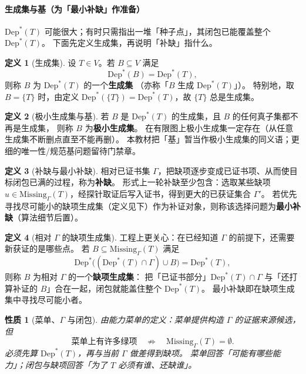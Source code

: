 \documentclass[UTF8,a4paper,11pt]{ctexart}
\theoremstyle{definition}
\newtheorem{definition}{定义}[section]
\theoremstyle{plain}
\newtheorem{property}{性质}[section]
\theoremstyle{remark}
\numberwithin{figure}{section}
\numberwithin{table}{section}
\begin{document}
\paragraph{生成集与基（为「最小补缺」作准备）}
$\mathrm{Dep}^*(T)$ 可能很大；有时只需指出一堆「种子点」，其闭包已能覆盖整个 $\mathrm{Dep}^*(T)$。
下面先定义生成集，再说明「补缺」指什么。

\begin{definition}[生成集]
设 $T\in V$。若 $B\subseteq V$ 满足
\[
\mathrm{Dep}^*(B)=\mathrm{Dep}^*(T),
\]
则称 $B$ 为 $\mathrm{Dep}^*(T)$ 的一个\textbf{生成集}
（亦称「$B$ 生成 $\mathrm{Dep}^*(T)$」）。
特别地，取 $B=\{T\}$ 时，由定义 $\mathrm{Dep}^*(\{T\})=\mathrm{Dep}^*(T)$，故 $\{T\}$ 总是生成集。
\end{definition}

\begin{definition}[极小生成集与基]
若 $B$ 是 $\mathrm{Dep}^*(T)$ 的生成集，且 $B$ 的任何真子集都不再是生成集，
则称 $B$ 为\textbf{极小生成集}。
在有限图上极小生成集一定存在（从任意生成集不断删点直至不能再删）。
本教材把「基」暂当作极小生成集的同义语；更细的唯一性/规范基问题留待门禁章。
\end{definition}

\begin{definition}[补缺与最小补缺]
相对已证书集 $\Gamma$，把缺项逐步变成已证书项、从而使目标闭包已满的过程，称为\textbf{补缺}。
形式上一轮补缺至少包含：选取某些缺项 $u\in\mathrm{Missing}_\Gamma(T)$，经探针取证后写入证书，得到更大的已获证集合 $\Gamma'$。
若优先寻找尽可能小的缺项生成集（定义见下）作为补证对象，则称该选择问题为\textbf{最小补缺}（算法细节后置）。
\end{definition}

\begin{definition}[相对 $\Gamma$ 的缺项生成集]
工程上更关心：在已经知道 $\Gamma$ 的前提下，还需要新获证的是哪些点。
若 $B\subseteq\mathrm{Missing}_\Gamma(T)$ 满足
\[
\mathrm{Dep}^*\bigl((\mathrm{Dep}^*(T)\cap\Gamma)\cup B\bigr)=\mathrm{Dep}^*(T),
\]
则称 $B$ 为相对 $\Gamma$ 的一个\textbf{缺项生成集}：
把「已证书部分」$\mathrm{Dep}^*(T)\cap\Gamma$ 与「还打算补证的 $B$」合在一起，闭包就能盖住整个 $\mathrm{Dep}^*(T)$。
最小补缺即在缺项生成集中寻找尽可能小者。
\end{definition}

\begin{property}[菜单、$\Gamma$ 与闭包]
由能力菜单的定义：菜单提供构造 $\Gamma$ 的证据来源候选，但
\[
\text{菜单上有许多绿项}
\quad\not\Rightarrow\quad
\mathrm{Missing}_\Gamma(T)=\emptyset.
\]
必须先算 $\mathrm{Dep}^*(T)$，再与当前 $\Gamma$ 做差得到缺项。
菜单回答「可能有哪些能力」；闭包与缺项回答「为了 $T$ 必须有谁、还缺谁」。
\end{property}
\end{document}
